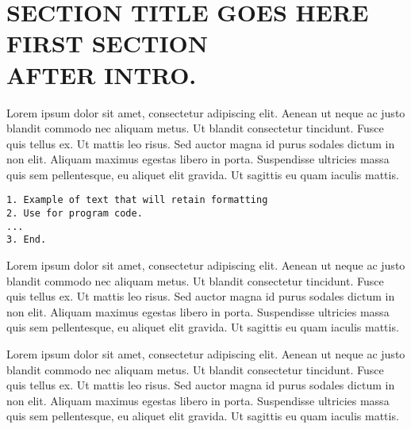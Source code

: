 \documentclass{csmagazine}
\begin{document}




\section*{SECTION TITLE GOES HERE FIRST SECTION \\AFTER INTRO.}

Lorem ipsum dolor sit amet, consectetur adipiscing elit. Aenean ut neque ac justo blandit commodo nec aliquam metus. Ut blandit consectetur tincidunt. Fusce quis tellus ex. Ut mattis leo risus. Sed auctor magna id purus sodales dictum in non elit. Aliquam maximus egestas libero in porta. Suspendisse ultricies massa quis sem pellentesque, eu aliquet elit gravida. Ut sagittis eu quam iaculis mattis.

\newpage

\begin{verbatim}
1. Example of text that will retain formatting
2. Use for program code.
...
3. End.
\end{verbatim}

Lorem ipsum dolor sit amet, consectetur adipiscing elit. Aenean ut neque ac justo blandit commodo nec aliquam metus. Ut blandit consectetur tincidunt. Fusce quis tellus ex. Ut mattis leo risus. Sed auctor magna id purus sodales dictum in non elit. Aliquam maximus egestas libero in porta. Suspendisse ultricies massa quis sem pellentesque, eu aliquet elit gravida. Ut sagittis eu quam iaculis mattis.

Lorem ipsum dolor sit amet, consectetur adipiscing elit. Aenean ut neque ac justo blandit commodo nec aliquam metus. Ut blandit consectetur tincidunt. Fusce quis tellus ex. Ut mattis leo risus. Sed auctor magna id purus sodales dictum in non elit. Aliquam maximus egestas libero in porta. Suspendisse ultricies massa quis sem pellentesque, eu aliquet elit gravida. Ut sagittis eu quam iaculis mattis.
\end{document}
